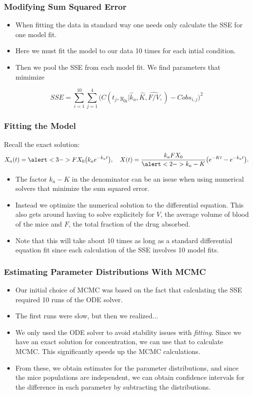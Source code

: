 \documentclass[t]{beamer}
\begin{document}
\begin{frame}
  \frametitle{Modifying Sum Squared Error}
  \begin{itemize}
    \item When fitting the data in standard way one needs only calculate the SSE for \alert{one} model fit.
    \item Here we must fit the model to our data \alert{10 times} for each intial condition.
    \item Then we pool the SSE from each model fit. We find parameters that mimimize
  \end{itemize}
  $$
    SSE = \sum_{i=1}^{10} \sum_{j=1}^4 \big(C(t_j,y_{0i}|\hat k_a,\hat K,\widehat{F/V},) - Cobs_{i,j}\big)^2
  $$
\end{frame}

\begin{frame}
  \frametitle{Fitting the Model}  
  Recall the exact solution:
  $$
  X_a(t) = \alert<3->{F}X_0 \big( k_ae^{-k_at} \big), \quad
  X(t) = \frac{k_a F X_0}{\alert<2->{k_a - K}}\big( e^{-Kt} - e^{-k_a t}\big).
  $$
\pause
\begin{itemize}
\item The factor \alert{$k_a - K$} in the denominator can be an issue when using
numerical solvers that minimize the sum squared error.
\pause
\item Instead we optimize the numerical solution to the differential equation. This also gets around having to solve explicitely for $V$, the average volume of blood of the mice and $F$, the total fraction of the drug absorbed. 
\pause
\item Note that this will take about 10 times as long as a standard differential equation fit since each calculation of the SSE involves 10 model fits.
\end{itemize}
\end{frame}

\begin{frame}
  \frametitle{Estimating Parameter Distributions With MCMC}
\begin{itemize}
  \item Our initial choice of MCMC was based on the fact that calculating the SSE required 10 runs of the ODE solver.
  \item The first runs were slow, but then we realized...
  \pause
  \item We only used the ODE solver to avoid stability issues with \emph{fitting}.  Since we have an exact solution for concentration, we can use that to calculate MCMC.  This significantly speeds up the MCMC calculations.
  \item From these, we obtain estimates for the parameter distributions, and since the mice populations are independent, we can obtain confidence intervals for the difference in each parameter by subtracting the distributions.
\end{itemize}
\end{frame}
\end{document}

